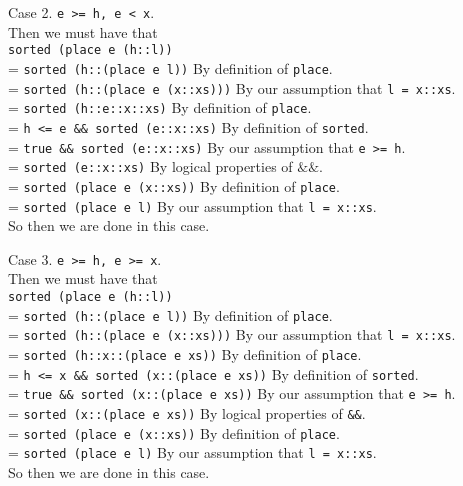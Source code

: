 \documentclass{article}
\begin{document}
\noindent Case 2. \texttt{e >= h, e < x}. \\
\noindent Then we must have that \\
\indent \texttt{sorted (place e (h::l))} \\
\indent = \texttt{sorted (h::(place e l))} \qquad By definition of \texttt{place}. \\
\indent = \texttt{sorted (h::(place e (x::xs)))} \qquad By our assumption that \texttt{l = x::xs}. \\
\indent = \texttt{sorted (h::e::x::xs)} \qquad By definition of \texttt{place}. \\
\indent = \texttt{h <= e \&\& sorted (e::x::xs)} \qquad By definition of \texttt{sorted}. \\
\indent = \texttt{true \&\& sorted (e::x::xs)} \qquad By our assumption that \texttt{e >= h}. \\
\indent = \texttt{sorted (e::x::xs)} \qquad By logical properties of $\&\&$. \\
\indent = \texttt{sorted (place e (x::xs))} \qquad By definition of \texttt{place}. \\
\indent = \texttt{sorted (place e l)} \qquad By our assumption that \texttt{l = x::xs}. \\
\noindent So then we are done in this case.

\noindent Case 3. \texttt{e >= h, e >= x}. \\
\noindent Then we must have that \\
\indent \texttt{sorted (place e (h::l))} \\
\indent = \texttt{sorted (h::(place e l))} \qquad By definition of \texttt{place}. \\
\indent = \texttt{sorted (h::(place e (x::xs)))} \qquad By our assumption that \texttt{l = x::xs}. \\
\indent = \texttt{sorted (h::x::(place e xs))} \qquad By definition of \texttt{place}. \\
\indent = \texttt{h <= x \&\& sorted (x::(place e xs))} \qquad By definition of \texttt{sorted}. \\
\indent = \texttt{true \&\& sorted (x::(place e xs))} \qquad By our assumption that \texttt{e >= h}. \\
\indent = \texttt{sorted (x::(place e xs))} \qquad By logical properties of \texttt{\&\&}. \\
\indent = \texttt{sorted (place e (x::xs))} \qquad By definition of \texttt{place}. \\
\indent = \texttt{sorted (place e l)} \qquad By our assumption that \texttt{l = x::xs}. \\
\noindent So then we are done in this case.
\end{document}
